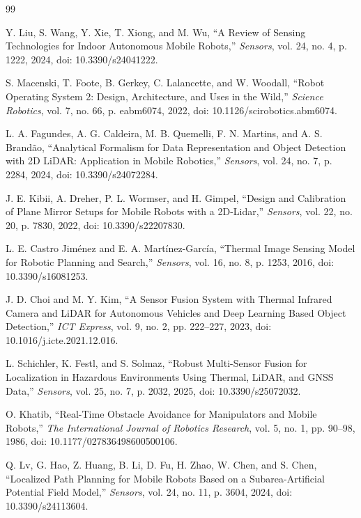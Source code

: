 \documentclass[10pt,twocolumn]{article}
\begin{document}
\balance
{\footnotesize
\begin{thebibliography}{99}

 Y. Liu, S. Wang, Y. Xie, T. Xiong, and M. Wu, ``A Review of Sensing Technologies for Indoor Autonomous Mobile Robots,'' \textit{Sensors}, vol. 24, no. 4, p. 1222, 2024, doi: 10.3390/s24041222.

 S. Macenski, T. Foote, B. Gerkey, C. Lalancette, and W. Woodall, ``Robot Operating System 2: Design, Architecture, and Uses in the Wild,'' \textit{Science Robotics}, vol. 7, no. 66, p. eabm6074, 2022, doi: 10.1126/scirobotics.abm6074.

 L. A. Fagundes, A. G. Caldeira, M. B. Quemelli, F. N. Martins, and A. S. Brand\~{a}o, ``Analytical Formalism for Data Representation and Object Detection with 2D LiDAR: Application in Mobile Robotics,'' \textit{Sensors}, vol. 24, no. 7, p. 2284, 2024, doi: 10.3390/s24072284.

 J. E. Kibii, A. Dreher, P. L. Wormser, and H. Gimpel, ``Design and Calibration of Plane Mirror Setups for Mobile Robots with a 2D-Lidar,'' \textit{Sensors}, vol. 22, no. 20, p. 7830, 2022, doi: 10.3390/s22207830.

 L. E. Castro Jim\'{e}nez and E. A. Mart\'{i}nez-Garc\'{i}a, ``Thermal Image Sensing Model for Robotic Planning and Search,'' \textit{Sensors}, vol. 16, no. 8, p. 1253, 2016, doi: 10.3390/s16081253.

 J. D. Choi and M. Y. Kim, ``A Sensor Fusion System with Thermal Infrared Camera and LiDAR for Autonomous Vehicles and Deep Learning Based Object Detection,'' \textit{ICT Express}, vol. 9, no. 2, pp. 222--227, 2023, doi: 10.1016/j.icte.2021.12.016.

 L. Schichler, K. Festl, and S. Solmaz, ``Robust Multi-Sensor Fusion for Localization in Hazardous Environments Using Thermal, LiDAR, and GNSS Data,'' \textit{Sensors}, vol. 25, no. 7, p. 2032, 2025, doi: 10.3390/s25072032.

 O. Khatib, ``Real-Time Obstacle Avoidance for Manipulators and Mobile Robots,'' \textit{The International Journal of Robotics Research}, vol. 5, no. 1, pp. 90--98, 1986, doi: 10.1177/027836498600500106.

 Q. Lv, G. Hao, Z. Huang, B. Li, D. Fu, H. Zhao, W. Chen, and S. Chen, ``Localized Path Planning for Mobile Robots Based on a Subarea-Artificial Potential Field Model,'' \textit{Sensors}, vol. 24, no. 11, p. 3604, 2024, doi: 10.3390/s24113604.


\end{thebibliography}}
\end{document}
